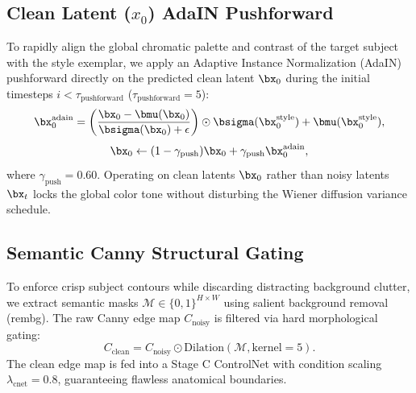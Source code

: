 \subsection{Clean Latent ($x_0$) AdaIN Pushforward}
\label{subsec:adain}
To rapidly align the global chromatic palette and contrast of the target subject with the style exemplar, we apply an Adaptive Instance Normalization (AdaIN)~\cite{huang2017arbitrary} pushforward directly on the predicted clean latent $\bx_0$ during the initial timesteps $i < \tau_{\text{pushforward}}$ ($\tau_{\text{pushforward}} = 5$):
\begin{equation}
    \bx_0^{\text{adain}} = \left( \frac{\bx_0 - \bmu(\bx_0)}{\bsigma(\bx_0) + \epsilon} \right) \odot \bsigma(\bx_0^{\text{style}}) + \bmu(\bx_0^{\text{style}}),
\end{equation}
\begin{equation}
    \bx_0 \leftarrow (1 - \gamma_{\text{push}}) \bx_0 + \gamma_{\text{push}} \bx_0^{\text{adain}},
\end{equation}
where $\gamma_{\text{push}} = 0.60$. Operating on clean latents $\bx_0$ rather than noisy latents $\bx_t$ locks the global color tone without disturbing the Wiener diffusion variance schedule.

\subsection{Semantic Canny Structural Gating}
\label{subsec:canny}
To enforce crisp subject contours while discarding distracting background clutter, we extract semantic masks $\mathcal{M} \in \{0, 1\}^{H \times W}$ using salient background removal (rembg). The raw Canny edge map $C_{\text{noisy}}$ is filtered via hard morphological gating:
\begin{equation}
    C_{\text{clean}} = C_{\text{noisy}} \odot \text{Dilation}(\mathcal{M}, \text{kernel}=5).
\end{equation}
The clean edge map is fed into a Stage C ControlNet with condition scaling $\lambda_{\text{cnet}} = 0.8$, guaranteeing flawless anatomical boundaries.
